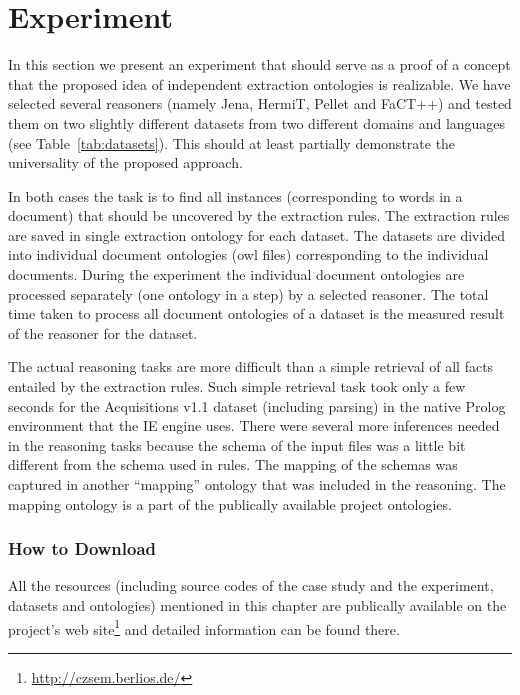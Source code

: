 \section{Experiment} \label{sec:ch70_experiment}


In this section we present an experiment that should serve as a proof of a concept that the proposed idea of independent extraction ontologies is realizable. We have selected several reasoners (namely Jena, HermiT, Pellet and FaCT++) and tested them on two slightly different datasets from two different domains and languages (see Table~\ref{tab:datasets}). This should at least partially demonstrate the universality of the proposed approach.

In both cases the task is to find all instances (corresponding to words in a document) that should be uncovered by the extraction rules. The extraction rules are saved in single extraction ontology for each dataset. The datasets are divided into individual document ontologies (owl files) corresponding to the individual documents. During the experiment the individual document ontologies are processed separately (one ontology in a step) by a selected reasoner. The total time taken to process all document ontologies of a dataset is the measured result of the reasoner for the dataset.

The actual reasoning tasks are more difficult than a simple retrieval of all facts entailed by the extraction rules. Such simple retrieval task took only a few seconds for the Acquisitions v1.1 dataset (including parsing) in the native Prolog environment that the IE engine uses. There were several more inferences needed in the reasoning tasks because the schema of the input files was a little bit different from the schema used in rules. The mapping of the schemas was captured in another ``mapping'' ontology that was included in the reasoning. The mapping ontology is a part of the publically available project ontologies.

\subsubsection{How to Download}
All the resources (including source codes of the case study and the experiment, datasets and ontologies) mentioned in this chapter are publically available on the project's web site\footnote{\url{http://czsem.berlios.de/}} and detailed information can be found there.

